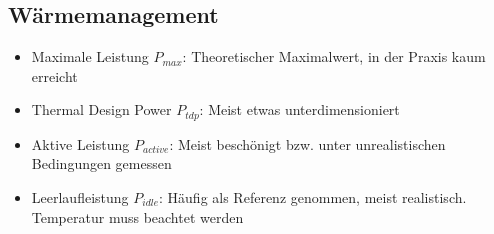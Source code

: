 \subsection{Wärmemanagement}
\begin{itemize}
	\item Maximale Leistung \(P_{max}\): Theoretischer Maximalwert, in der Praxis kaum erreicht
	\item Thermal Design Power \(P_{tdp}\): Meist etwas unterdimensioniert
	\item Aktive Leistung \(P_{active}\): Meist beschönigt bzw. unter unrealistischen Bedingungen gemessen
	\item Leerlaufleistung \(P_{idle}\): Häufig als Referenz genommen, meist realistisch. Temperatur muss beachtet werden
\end{itemize}


